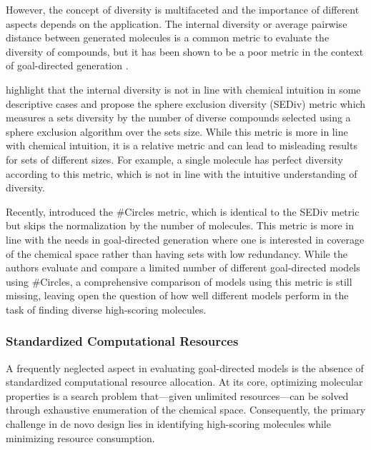 However, the concept of diversity is multifaceted and the importance of different aspects depends on
the application. The internal diversity or average pairwise distance between generated molecules is
a common metric to evaluate the diversity of compounds, but it has been shown to be a poor metric in
the context of goal-directed generation
\citep{waldmanNovelAlgorithmsOptimization2000,xieMARSMarkovMolecular2021,thomasComparisonStructureLigandbased2021}.

\citet{thomasComparisonStructureLigandbased2021} highlight that the internal diversity is not in
line with chemical intuition in some descriptive cases and propose the sphere exclusion diversity
(SEDiv) metric which measures a sets diversity by the number of diverse compounds selected using a
sphere exclusion algorithm \citep{gobbiDISEDirectedSphere2003,sayle2DSimilarityDiversity2019} over the sets size. While this metric is more in line with chemical intuition, it is a
relative metric and can lead to misleading results for sets of different sizes. For example, a
single molecule has perfect diversity according to this metric, which is not in line with the
intuitive understanding of diversity.

Recently, \citet{xieHowMuchSpace2023} introduced the \#Circles metric, which is identical to the
SEDiv metric but skips the normalization by the number of molecules. This metric is more in line
with the needs in goal-directed generation where one is interested in coverage of the chemical space
rather than having sets with low redundancy. While the authors evaluate and compare a limited number
of different goal-directed models using \#Circles, a comprehensive comparison of models using this
metric is still missing, leaving open the question of how well different models perform in the task
of finding diverse high-scoring molecules.

\subsubsection{Standardized Computational Resources}
A frequently neglected aspect in evaluating goal-directed models is the absence of standardized
computational resource allocation. At its core, optimizing molecular properties is a search problem
that—given unlimited resources—can be solved through exhaustive enumeration of the chemical space.
Consequently, the primary challenge in de novo design lies in identifying high-scoring molecules
while minimizing resource consumption.

